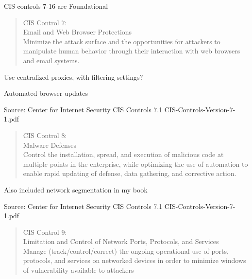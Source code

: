 \documentclass[Screen16to9,17pt]{foils}
\begin{document}

CIS controls 7-16 are Foundational

\begin{quote}
CIS Control 7:\\
Email and Web Browser Protections\\
Minimize the attack surface and the opportunities for attackers to manipulate human behavior through their interaction with web browsers and email systems.
\end{quote}

\begin{list1}
\item Use centralized proxies, with filtering settings?
\item Automated browser updates
\item
\item
\end{list1}

Source: Center for Internet Security CIS Controls 7.1 CIS-Controls-Version-7-1.pdf


\begin{quote}
CIS Control 8:\\
Malware Defenses\\
Control the installation, spread, and execution of malicious code at multiple points in the enterprise, while optimizing the use of automation to enable rapid updating of defense, data gathering, and corrective action.
\end{quote}

\begin{list1}
\item Also included network segmentation in my book
\item
\item
\item
\end{list1}

Source: Center for Internet Security CIS Controls 7.1 CIS-Controls-Version-7-1.pdf


\begin{quote}
CIS Control 9:\\
Limitation and Control of Network Ports,
Protocols, and Services\\
Manage (track/control/correct) the ongoing operational use of ports, protocols, and services on networked devices in order to minimize windows of vulnerability available to attackers
\end{quote}
\end{document}
